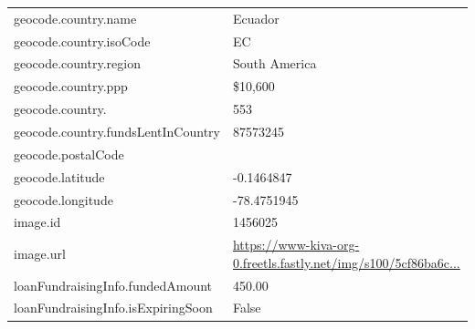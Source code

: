 \begin{longtable}{|p{}|p{}|}
	geocode.country.name                            & Ecuador                                                                                                       \\
	geocode.country.isoCode                         & EC                                                                                                            \\
	geocode.country.region                          & South America                                                                                                 \\
	geocode.country.ppp                             & \$10,600                                                                                                      \\
	geocode.country.\densetext{numLoansFundraising} & 553                                                                                                           \\
	geocode.country.fundsLentInCountry              & 87573245                                                                                                      \\
	geocode.postalCode                              &                                                                                                               \\
	geocode.latitude                                & -0.1464847                                                                                                    \\
	geocode.longitude                               & -78.4751945                                                                                                   \\
	image.id                                        & 1456025                                                                                                       \\
	image.url                                       &
	\href{https://www-kiva-org-0.freetls.fastly.net/img/s100/5cf86ba6c72db94f0721b934a57ca889.jpg}{https://www-kiva-org-0.freetls.fastly.net/img/s100/5cf86ba6c...} \\
	loanFundraisingInfo.fundedAmount                & 450.00                                                                                                        \\
	loanFundraisingInfo.isExpiringSoon              & False                                                                                                         \\

\end{longtable}
